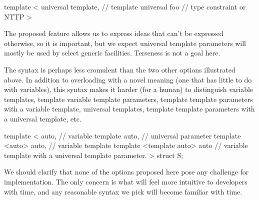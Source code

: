 \documentclass{wg21}
\begin{document}
\begin{colorblock}
template <
        universal template, // template
        universal foo       // type constraint or NTTP
>
\end{colorblock}

%


The proposed feature allows us to express ideas that can't be expressed otherwise, so it is important,
but we expect universal template parameters will mostly be used by select generic facilities. Terseness is not a goal here.

The  syntax is perhaps less cromulent than the two other options illustrated above. In addition to overloading
 with a novel meaning (one that has little to do with variables), this syntax makes it harder (for a human) to distinguish
variable templates, template variable template parameters, template template parameters with a variable template, universal templates,
template template parameters with a universal template, etc.

\begin{colorblock}
template <
   auto, // variable
   template auto, // universal parameter
   template <auto> auto, // variable template
   template <template auto> auto // variable template with a universal template parameter.
>
struct S;
\end{colorblock}


We should clarify that none of the options proposed here pose any challenge for implementation. The only concern is what will feel more intuitive to
developers with time, and any reasonable syntax we pick will become familiar with time.
\end{document}
